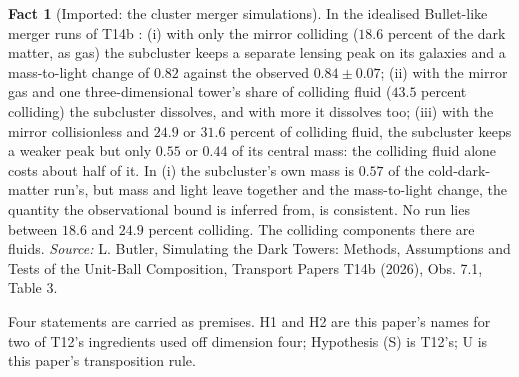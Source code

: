 \documentclass[11pt]{article}
\theoremstyle{definition}
\newtheorem{fact}[theorem]{Fact}
\theoremstyle{plain}
\newcommand{\changedmark}[2]{\marginpar{\raggedright\scriptsize\color{#1}#2}}
\begin{document}
\begin{fact}[Imported: the cluster merger simulations]\label{c:dark-tower-matter.imported-cluster-simulations}
\changedmark{BurntOrange}{changed since the deposit}
In the idealised Bullet-like merger runs of T14b \cite[Obs.~7.1, Table~3]{ButlerT14b}: (i) with only the mirror colliding ($18.6$ percent of the dark matter, as gas) the subcluster keeps a separate lensing peak on its galaxies and a mass-to-light change of $0.82$ against the observed $0.84 \pm 0.07$; (ii) with the mirror gas and one three-dimensional tower's share of colliding fluid ($43.5$ percent colliding) the subcluster dissolves, and with more it dissolves too; (iii) with the mirror collisionless and $24.9$ or $31.6$ percent of colliding fluid, the subcluster keeps a weaker peak but only $0.55$ or $0.44$ of its central mass: the colliding fluid alone costs about half of it. In (i) the subcluster's own mass is $0.57$ of the cold-dark-matter run's, but mass and light leave together and the mass-to-light change, the quantity the observational bound is inferred from, is consistent. No run lies between $18.6$ and $24.9$ percent colliding. The colliding components there are fluids.
\emph{Source:} L. Butler, Simulating the Dark Towers: Methods, Assumptions and Tests of the Unit-Ball Composition, Transport Papers T14b (2026), Obs. 7.1, Table 3.
\end{fact}

\label{c:note.dark-tower-matter.setting-setting-imports-premises-2}
Four statements are carried as premises. H1 and H2 are this paper's names for two of T12's ingredients used off dimension four; Hypothesis (S) is T12's; U is this paper's transposition rule.
\end{document}
